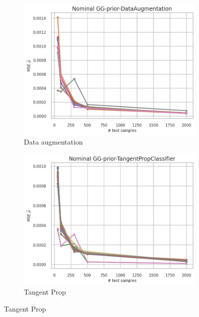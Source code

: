 \begin{figure}[ht!]
  \begin{subfigure}[t]{0.49\linewidth}
    \includegraphics[width=\linewidth]{COMPARE/GG-prior/DataAugmentation/profusion_nominal_n_samples_mse.png}
    \caption{Data augmentation}
  \end{subfigure}%
  \hfill
  \begin{subfigure}[t]{0.49\linewidth}
    \includegraphics[width=\linewidth]{COMPARE/GG-prior/TangentPropClassifier/profusion_nominal_n_samples_mse.png}
    \caption{Tangent Prop}
  \end{subfigure}


\end{figure}
